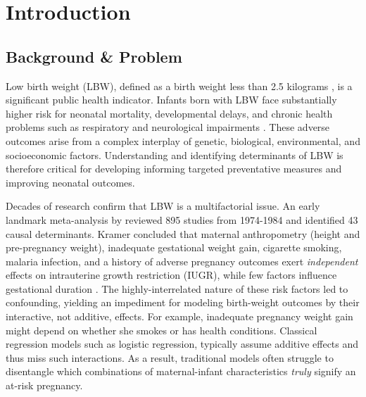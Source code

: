 \newpage 
\chapter{Introduction}
\label{chap:introduction}

\section{Background \& Problem}

Low birth weight (LBW), defined as a birth weight less than 2.5 kilograms \parencite{lbw_def, kramer1987}, is a significant public health indicator. Infants born with LBW face substantially higher risk for neonatal mortality, developmental delays, and chronic health problems such as respiratory and neurological impairments \parencite{finch2003}. These adverse outcomes arise from a complex interplay of genetic, biological, environmental, and socioeconomic factors. Understanding and identifying determinants of LBW is therefore critical for developing informing targeted preventative measures and improving neonatal outcomes. 

Decades of research confirm that LBW is a multifactorial issue. An early landmark meta-analysis by \textcite{kramer1987} reviewed 895 studies from 1974-1984 and identified 43 causal determinants. Kramer concluded that maternal anthropometry (height and pre-pregnancy weight), inadequate gestational weight gain, cigarette smoking, malaria infection, and a history of adverse pregnancy outcomes exert \emph{independent} effects on intrauterine growth restriction (IUGR), while few factors influence gestational duration \parencite{kramer1987}. The highly-interrelated nature of these risk factors led to confounding, yielding an impediment for modeling birth-weight outcomes by their interactive, not additive, effects. For example, inadequate pregnancy weight gain might depend on whether she smokes or has health conditions. Classical regression models such as logistic regression, typically assume additive effects and thus miss such interactions. As a result, traditional models often struggle to disentangle which combinations of maternal-infant characteristics \emph{truly} signify an at-risk pregnancy.

